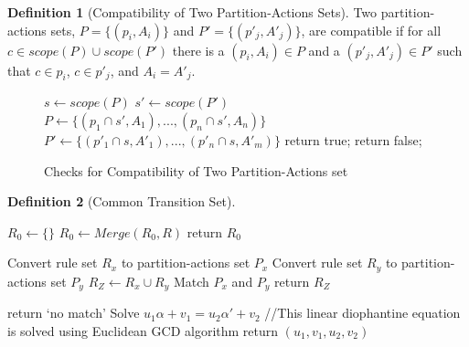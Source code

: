 \documentclass[runningheads,a4paper]{llncs}
\theoremstyle{definition}
\newtheorem{definition2}{Definition}
\begin{document}
\begin{definition2}[Compatibility of Two Partition-Actions Sets] Two partition-actions sets, 
$P=\{(p_i,A_i)\}$ and $P'=\{(p'_j,A'_j)\}$, are compatible if for all $c \in scope(P) \cup 
scope(P')$ there is a $(p_i, A_i)\in P$ and a $(p'_j,A'_j) \in P'$  such that $c\in p_i$,
$c\in p'_j$, and $A_i=A'_j$.
\end{definition2}

\begin{figure}
\begin{algorithm}[H]
\SetAlgoLined
{}
$s  \leftarrow scope(P)$\;
$s' \leftarrow scope(P')$\;
$P  \leftarrow \{(p_1\cap s', A_1),...,(p_n\cap s', A_n)\}$\;
$P' \leftarrow \{(p'_1\cap s, A'_1),...,(p'_n\cap s, A'_m)\}$\;
{
   return true;
}
{
   return false;
}
\caption{$Compatible(P,P')$}
\end{algorithm}
\caption{Checks for Compatibility of Two Partition-Actions set}
\end{figure}


\begin{definition2}[Common Transition Set]
\end{definition2}



\begin{algorithm}[H]
\SetAlgoLined
{}
$R_0 \leftarrow \{\}$\;
{
   $R_0 \leftarrow Merge(R_0,R)$\;
}
return $R_0$\;
\caption{Homogenization Algorithm}
\end{algorithm}

\begin{algorithm}[H]
\SetAlgoLined
{}
Convert rule set $R_x$ to partition-actions set $P_x$\;
Convert rule set $R_y$ to partition-actions set $P_y$\;
{
   $R_Z \leftarrow R_x \cup R_y$\;
}
{
   Match $P_x$ and $P_y$\; 
   {
   }
}
return $R_Z$\;
\caption{Merging Two Rule Sets}
\end{algorithm}


\begin{algorithm}[H]
\SetAlgoLined
{}

{
   return `no match'\;
}
{
   Solve $u_1\alpha+v_1=u_2\alpha'+v_2$\;
   //This linear diophantine equation is solved using Euclidean GCD algorithm\;
}
return $(u_1,v_1,u_2,v_2)$\;
\caption{Matching of Two Partition-Actions Pairs}
\end{algorithm}




\end{document}
